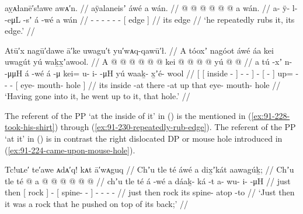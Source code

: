 \ex\label{ex:91-230-repeatedly-rub-edge}%
%
\begingl
	\glpreamble	aỵᴀłanē′s!awe awᴀ′n. //
	\glpreamble	aÿalaneisʼ áwé a wán. //
	\gla	{} @ {} @ {} @ {} @ {} @ {} 
		 @ {}
		{} a wán. {} //
	\glb	a- ÿ- l-  -eμL -sʼ
		á -wé
		{} a wán {} //
	\glc	{}- - -  - -
		 -
		{}[  edge {}] //
	\gld	{} {} {} {} {} {}
		 {}
		{} its edge {} //
	\glft	‘he repeatedly rubs it, its edge.’
		//
\endgl
\xe


\ex\label{ex:91-231-gotten-in-went-up-to-hole}%
%
\begingl
	\glpreamble	Atū′x nagū′dawe ā′ke uwagu′t yu′wᴀq-qawū′ł. //
	\glpreamble	A tóoxʼ nagóot áwé áa kei uwagút yú waḵx̱ʼawool. //
	\gla	{} {} A  @ {} {}
			 @ {} @ {} @ {} {}
		 @ {}
		{}  @ {} {}
		kei @  @ {} @ {} @ {}
		{} yú  @ {} @ {} {} //
	\glb	{} {} a tú -xʼ {}
			n-  -μμH {} {}
		á -wé
		{} á -μ {}
		kei= u- i-  -μH
		{} yú waaḵ- x̱ʼé- wool {} //
	\glc	{}[ {}[  inside - {}]
			-  - \· {}]
		 -
		{}[  - {}]
		up= - -  -
		{}[  eye- mouth- hole {}] //
	\gld	{} {} its inside -at {}
			 {} {} {} {}
		 {}
		{} there -at {} 
		up  {} {} {}
		{} that eye- mouth- hole {} //
	\glft	‘Having gone into it, he went up to it, that hole.’
		//
\endgl
\xe

The referent of the PP  ‘at the inside of it’ in (\lastx) is the  mentioned in (\ref{ex:91-228-took-his-shirt}) through (\ref{ex:91-230-repeatedly-rub-edge}).
The referent of the PP  ‘at it’ in (\lastx) is in contrast the right dislocated DP  or mouse hole introduced in (\ref{ex:91-224-came-upon-mouse-hole}).

\ex\label{ex:91-232-rock-push-atop-back}%
%
\begingl
	\glpreamble	Tc!uʟe′ te′awe ᴀdᴀ′q! kᴀt ā′wᴀguq //
	\glpreamble	Chʼu tle té áwé a dix̱ʼkát aawagúḵ; //
	\gla	Chʼu tle {} té {}  @ {}
		{} a  @ {} @ {} {}
		 @ {} @ {} @ {} @ {} //
	\glb	chʼu tle {} té {} á -wé
		{} a dáaḵ- ká -t {}
		a- wu- i-  -μH //
	\glc	just then {}[ rock {}]  -
		{}[  spine-  - {}]
		- - -  - //
	\gld	just then {} rock {}  {}
		{} its spine- atop -to {}
		 {} {} {} {} //
	\glft	‘Just then it was a rock that he pushed on top of its back;’
		//
\endgl
\xe

